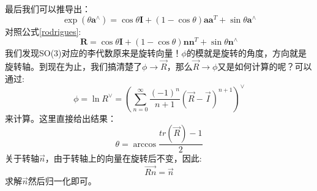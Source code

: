 最后我们可以推导出：
\begin{equation}
\exp \left(\theta \boldsymbol{a}^{\wedge}\right)=\cos \theta \boldsymbol{I}+(1-\cos \theta) \boldsymbol{a} \boldsymbol{a}^{T}+\sin \theta \boldsymbol{a}^{\wedge}
\end{equation}
对照公式\ref{rodrigues}:
\begin{equation*}
	\boldsymbol{R}=\cos \theta \boldsymbol{I}+(1-\cos \theta) \boldsymbol{n} \boldsymbol{n}^{T}+\sin \theta \boldsymbol{n}^{\wedge}
\end{equation*}
我们发现SO(3)对应的李代数原来是旋转向量！$\phi$的模就是旋转的角度，方向就是旋转轴。到现在为止，我们搞清楚了$\phi \rightarrow \vec{R}$，那么$\vec{R}\rightarrow \phi$又是如何计算的呢？可以通过:
\begin{equation}
	\phi = \ln{R}^\vee=\left(
	\sum_{n=0}^{\infty}\frac{(-1)^n}{n+1}(\vec{R}-\vec{I})^{n+1}
	\right)^\vee
\end{equation}
来计算。这里直接给出结果：
\begin{equation}
	\theta=\arccos{\frac{tr(\vec{R})-1}{2}}
\end{equation}
关于转轴$\vec n$，由于转轴上的向量在旋转后不变，因此:
\begin{equation}
	\vec{Rn}=\vec{n}
\end{equation}
求解$\vec n$然后归一化即可。
